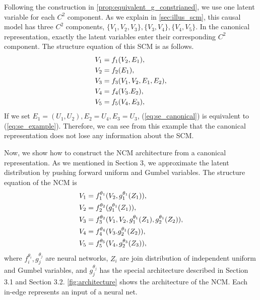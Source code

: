 Following the construction in \cref{prop:equivalent_g_constrianed}, we use one latent variable for each $C^2$ component. As we explain in \cref{sec:illus_scm}, this causal model has three $C^2$ components, $ \{V_1,V_2,V_3\}, \{V_3,V_4\}, \{V_4,V_5\} $. In the canonical representation, exactly the latent variables enter their corresponding $C^2$ component. The structure equation of this SCM is as follows. 
\begin{align}
    &V_1 = f_1(V_2,E_1), \notag\\
    &V_2 = f_2(E_1), \notag\\
    &V_3 = f_3(V_1,V_2,E_1,E_2), \label{eq:se_canonical}\\
    &V_4 = f_4(V_3.E_2), \notag\\
    &V_5 = f_5(V_4,E_3), \notag
\end{align}
If we set $E_1 = (U_1,U_2), E_2 = U_4, E_3 = U_3$, (\ref{eq:se_canonical}) is equivalent to (\ref{eq:se_example}). Therefore, we can see from this example that the canonical representation does not lose any information about the SCM. 

Now, we show how to construct the NCM architecture from a canonical representation. As we mentioned in Section 3, we approximate the latent distribution by pushing forward uniform and Gumbel variables. The structure equation of the NCM is 
\begin{align}
    &V_1 = f^{\theta_1}_1(V_2,g_1^{\theta_1}(Z_1)), \notag\\
    &V_2 = f^{\theta_2}_2(g_1^{\theta_1}(Z_1)), \notag\\
    &V_3 = f^{\theta_2}_3(V_1,V_2,g_1^{\theta_1}(Z_1),g_2^{\theta_1}(Z_2)), \label{eq:se_canonical2}\\
    &V_4 = f_4^{\theta_4}(V_3.g_2^{\theta_1}(Z_2)), \notag\\
    &V_5 = f_5^{\theta_5}(V_4,g_2^{\theta_3}(Z_3)), \notag
\end{align}
where $f_i^{\theta_i}, g_j^{\theta_j}$ are neural networks, $Z_i$ are join distribution of independent uniform and Gumbel variables, and $g_j^{\theta_j}$ has the special architecture described in Section 3.1 and Section 3.2. \cref{fig:architecture} shows the architecture of the NCM. Each in-edge represents an input of a neural net.  

